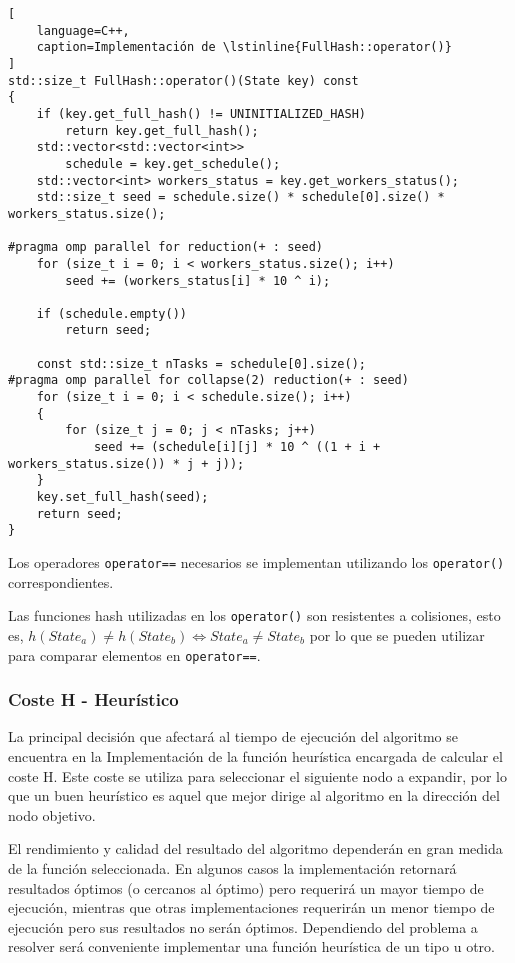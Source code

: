 \begin{lstlisting}[
    language=C++,
    caption=Implementación de \lstinline{FullHash::operator()}
]
std::size_t FullHash::operator()(State key) const
{
    if (key.get_full_hash() != UNINITIALIZED_HASH)
        return key.get_full_hash();
    std::vector<std::vector<int>>
        schedule = key.get_schedule();
    std::vector<int> workers_status = key.get_workers_status();
    std::size_t seed = schedule.size() * schedule[0].size() * workers_status.size();

#pragma omp parallel for reduction(+ : seed)
    for (size_t i = 0; i < workers_status.size(); i++)
        seed += (workers_status[i] * 10 ^ i);

    if (schedule.empty())
        return seed;

    const std::size_t nTasks = schedule[0].size();
#pragma omp parallel for collapse(2) reduction(+ : seed)
    for (size_t i = 0; i < schedule.size(); i++)
    {
        for (size_t j = 0; j < nTasks; j++)
            seed += (schedule[i][j] * 10 ^ ((1 + i + workers_status.size()) * j + j));
    }
    key.set_full_hash(seed);
    return seed;
}
\end{lstlisting}

Los operadores \lstinline{operator==} necesarios se implementan utilizando
los \lstinline{operator()} correspondientes.

\begin{notebox}
    Las funciones hash utilizadas en los \lstinline{operator()}
    son resistentes a colisiones,
    esto es, $
    h(State_a) \ne h(State_b) \iff State_a \ne State_b
    $
    por lo que se pueden
    utilizar para comparar elementos en \lstinline{operator==}.
\end{notebox}

\subsubsection{Coste H - Heurístico}

La principal decisión que afectará al tiempo de ejecución
del algoritmo se encuentra en la Implementación
de la función heurística encargada de calcular el coste H.
Este coste se utiliza para seleccionar el siguiente nodo
a expandir, por lo que un buen heurístico es aquel que
mejor dirige al algoritmo en la dirección del nodo objetivo.

El rendimiento y calidad del resultado del algoritmo
dependerán en gran medida de la función seleccionada.
En algunos casos la implementación retornará resultados
óptimos (o cercanos al óptimo) pero requerirá un mayor tiempo
de ejecución, mientras que otras implementaciones
requerirán un menor tiempo de ejecución pero sus resultados
no serán óptimos.
Dependiendo del problema a resolver será conveniente implementar
una función heurística de un tipo u otro.

